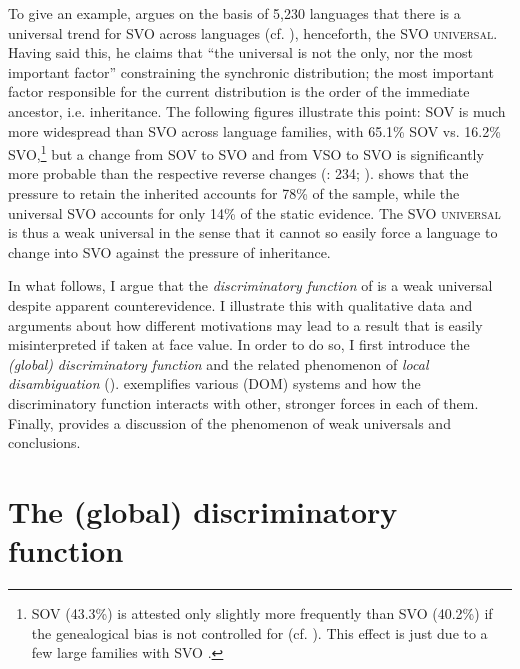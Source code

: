 \documentclass[output=paper]{langsci/langscibook}
\begin{document}
To give an example, \citet{Hammarström2015} argues on the basis of 5,230 languages that there is a universal trend for SVO  across languages (cf. \citealt{Gell-MannRuhlen2011,MauritsGriffiths2014}), henceforth, the \textsc{SVO universal}. Having said this, he claims that “the universal is not the only, nor the most important factor” constraining the synchronic distribution; the most important factor responsible for the current distribution is the order of the immediate ancestor, i.e. inheritance. The following figures illustrate this point: SOV is much more widespread than SVO across language families, with 65.1\% SOV vs. 16.2\% SVO,\footnote{SOV (43.3\%) is attested only slightly more frequently than SVO (40.2\%) if the genealogical bias is not controlled for (cf. \citealt{Dryer2013_SOV}). This effect is just due to a few large families with SVO \citep{Hammarström2015}.} but a change from SOV to SVO and from VSO to SVO is significantly more probable than the respective reverse changes (\citealt{Croft2003}: 234; \citealt{MauritsGriffiths2014}). \citet{Hammarström2015} shows that the pressure to retain the inherited  accounts for 78\% of the sample, while the universal SVO accounts for only 14\% of the static evidence. The SVO \textsc{universal} is thus a weak universal in the sense that it cannot so easily force a language to change into SVO against the pressure of inheritance.

In what follows, I argue that the \textit{discriminatory} \textit{function} of  is a weak universal despite apparent counterevidence. I illustrate this with qualitative data and arguments about how different motivations may lead to a result that is easily misinterpreted if taken at face value. In order to do so, I first introduce the \textit{(global)} \textit{discriminatory} \textit{function} and the related phenomenon of \textit{local} \textit{disambiguation} ().  exemplifies various  (DOM) systems and how the discriminatory function interacts with other, stronger forces in each of them. Finally,  provides a discussion of the phenomenon of weak universals and conclusions.

\section{The (global) discriminatory function}\label{sec:serzant:2}
\end{document}
